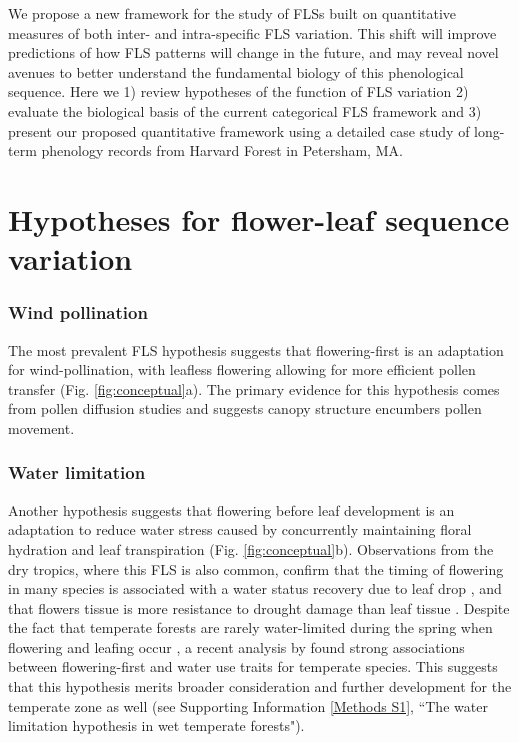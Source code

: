 \documentclass[11pt]{article}
\begin{document}
\noindent We propose a new framework for the study of FLSs built on quantitative measures of both inter- and intra-specific FLS variation. This shift will improve predictions of how FLS patterns will change in the future, and  may reveal novel avenues to better understand the fundamental biology of this phenological sequence. Here we 1) review hypotheses of the function of FLS variation 2) evaluate the biological basis of the current categorical FLS framework and 3) present our proposed quantitative framework using a detailed case study of long-term phenology records from Harvard Forest in Petersham, MA.

\section*{Hypotheses for flower-leaf sequence variation}
\subsubsection*{ Wind pollination}
\noindent The most prevalent FLS hypothesis suggests that flowering-first is an adaptation for wind-pollination, with leafless flowering allowing for more efficient pollen transfer \citep{Whitehead1969}(Fig. \ref{fig:conceptual}a). The primary evidence for this hypothesis comes from pollen diffusion studies \citep[e.g., particle movement through closed and open canopies,][]{Niklas1985, Milleron2012} and suggests canopy structure encumbers pollen movement. %
\subsubsection*{Water limitation}
\noindent Another hypothesis suggests that flowering before leaf development is an adaptation to reduce water stress caused by concurrently maintaining floral hydration and leaf transpiration \citep{Franklin2016} (Fig. \ref{fig:conceptual}b). Observations from the dry tropics, where this FLS is also common, confirm that the timing of flowering in many species is associated with a water status recovery due to leaf drop \citep{Borchert1983,Reich1984}, and that flowers tissue is more resistance to drought damage than leaf tissue \citep{Zhang2017}. Despite the fact that temperate forests are rarely water-limited during the spring when flowering and leafing occur \citep{Polgar2011}, a recent analysis by \citet{Gougherty2018} found strong associations between flowering-first and water use traits for temperate species. This suggests that this hypothesis merits broader consideration and further development for the temperate zone as well (see Supporting Information \ref{Methods S1}, ``The water limitation hypothesis in wet temperate forests"). %
 
\end{document}
